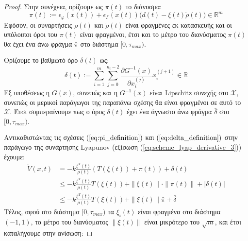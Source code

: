 \begin{proof}
Στην συνέχεια, ορίζουμε ως $\pi(t)$ το διάνυσμα:
\begin{equation}
	\pi(t) := \epsilon_{\varphi}(x(t) )  
	+  \epsilon_{\Gamma}(x(t)) \big( d(t) - \xi(t)\dot{\rho}(t) \big)
	\in \mathbb{R}^m
	\label{eq:pi_definition}
\end{equation}
Εφόσον, οι συναρτήσεις $\rho(t)$ και $\dot{\rho}(t)$ είναι φραγμένες εκ κατασκευής και οι υπόλοιποι όροι του $\pi(t)$ είναι φραγμένοι, έτσι και το μέτρο του διανύσματος $\pi(t)$ θα έχει ένα άνω φράγμα $\bar{\pi}$ στο διάστημα $[0, \tau_{max})$.

Ορίζουμε το βαθμωτό όρο $\delta(t)$ ως:
\begin{equation}
	\delta(t) := \sum_{i=1}^{m} \sum_{j=0}^{n_i - 2} 
	\frac{\partial G^{-1}(x) }{\partial x_i^{(j)}} x_i^{(j +1)} \in \mathbb{R}
	\label{eq:delta_definition}
\end{equation}
Εξ υποθέσεως η $G(x)$, συνεπώς και η $G^{-1}(x)$ είναι Lipschitz συνεχής στο $\mathcal{X}$, συνεπώς οι μερικοί παράγωγοι της παραπάνω σχέσης θα είναι φραγμένοι σε αυτό το $\mathcal{X}$. Έτσι συμπεραίνουμε πως ο όρος $\delta(t)$ έχει ένα άγνωστο άνω φράγμα $\bar{\delta}$ στο $[0,\tau_{max})$.

Αντικαθιστώντας τις σχέσεις $(\ref{eq:pi_definition})$ και $(\ref{eq:delta_definition})$ στην παράγωγο της συνάρτησης Lyapunov (εξίσωση  (\ref{eq:scheme_lyap_derivative_3})) έχουμε:
\begin{equation}
\begin{split}
	\dot{V}(x,t) &= 
	-k \frac{\xi^T(t)} {\rho(t)} \left( T(\xi(t)) + \pi(t) \right)  
	+ \delta(t) \\
	&\leq -k \frac{\xi^T(t)} {\rho(t)} T(\xi(t)) 
	+ \| \xi(t) \| \cdot \| \pi(t) \| + | \delta(t) |\\
	&\leq  -k \frac{\xi^T(t)} {\rho(t)} T(\xi(t)) 
	+ \| \xi(t) \| \bar{\pi} + \bar{\delta}
	\end{split}
\end{equation}
Τέλος, αφού στο διάστημα $[0, \tau_{max} )$ τα $\xi_i(t)$ είναι φραγμένα στο διάστημα $(-1,1)$, το μέτρο του διανύσματος $\| \xi(t) \|$ είναι μικρότερο του $\sqrt{m}$, και έτσι καταλήγουμε στην ανίσωση:


\end{proof}
